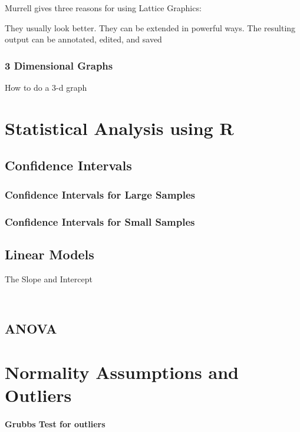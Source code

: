 \documentclass[a4paper,12pt]{article}
\begin{document}
\begin{itemize}
	Murrell gives three reasons for using Lattice Graphics:
	
	They usually look better.
	They can be extended in powerful ways.
	The resulting output can be annotated, edited, and saved
	
	\subsection{3 Dimensional Graphs}
	How to do a 3-d graph
	
	\newpage
	\chapter{Statistical Analysis using R}
	\section{Confidence Intervals}
	\subsection{Confidence Intervals for Large Samples}
	\subsection{Confidence Intervals for Small Samples}
	
	\section{Linear Models}
	
	The Slope and Intercept
	\begin{framed}
		\begin{verbatim}
		
		\end{verbatim}
	\end{framed}
	
	\section{ANOVA}
	
	
	\newpage
	\chapter{Normality Assumptions and Outliers}
	\subsubsection{Grubbs Test for outliers}

\end{itemize}
\end{document}
